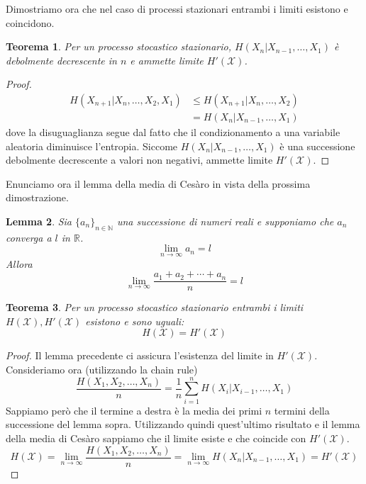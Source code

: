 \documentclass[a4paper,11pt]{book}
\theoremstyle{plain}
\newtheorem{teo}{Teorema}[chapter]
\newtheorem{lemma}[teo]{Lemma}
\theoremstyle{definition}
\theoremstyle{remark}
\newcommand{\R}{\mathbb{R}}
\newcommand{\N}{\mathbb{N}}
\begin{document}
Dimostriamo ora che nel caso di processi stazionari entrambi i limiti esistono e coincidono.
\begin{teo}
	Per un processo stocastico stazionario, $H(X_n|X_{n-1},\ldots, X_1)$ è debolmente decrescente in $n$ e ammette limite $H'(\mathcal{X})$.
\end{teo}
\begin{proof}
	\begin{equation*}
	\begin{split}
		H(X_{n+1}|X_n,\ldots, X_2, X_1) & \leq H(X_{n+1}|X_n,\ldots, X_2)\\
		& = H(X_n|X_{n-1},\ldots, X_1)
	\end{split}
	\end{equation*}
	dove la disuguaglianza segue dal fatto che il condizionamento a una variabile aleatoria diminuisce l'entropia.\newline
	Siccome $H(X_n|X_{n-1},\ldots, X_1)$ è una successione debolmente decrescente a valori non negativi, ammette limite $H'(\mathcal{X})$.
\end{proof}
Enunciamo ora il lemma della media di Cesàro in vista della prossima dimostrazione.
\begin{lemma}
	Sia $\{a_n\}_{n\in\N}$ una successione di numeri reali e supponiamo che $a_n$ converga a $l$ in $\R$.
	\begin{equation*}
		\lim\limits_{n\to\infty}a_n = l
	\end{equation*}
	Allora
	\begin{equation*}
		\lim\limits_{n\to\infty}\frac{a_1+a_2+\cdots+a_n}{n}=l
	\end{equation*}
\end{lemma}
\begin{teo}
	Per un processo stocastico stazionario entrambi i limiti $H(\mathcal{X}),H'(\mathcal{X})$ esistono e sono uguali:
	\begin{equation*}
		H(\mathcal{X}) = H'(\mathcal{X})
	\end{equation*}
\end{teo}
\begin{proof}
	Il lemma precedente ci assicura l'esistenza del limite in $H'(\mathcal{X})$. Consideriamo ora (utilizzando la chain rule)
	\begin{equation*}
		\frac{H(X_1,X_2,\ldots, X_n)}{n} = \frac{1}{n}\sum_{i = 1}^{n}{H(X_i|X_{i-1},\ldots, X_1)}
	\end{equation*}
	Sappiamo però che il termine a destra è la media dei primi $n$ termini della successione del lemma sopra. Utilizzando quindi quest'ultimo risultato e il lemma della media di Cesàro sappiamo che il limite esiste e che coincide con $H'(\mathcal{X})$.
	\begin{equation*}
		H(\mathcal{X}) = \lim\limits_{n\to\infty}\frac{H(X_1, X_2, \ldots, X_n)}{n} = \lim \limits_{n\to\infty}H(X_n|X_{n-1},\ldots, X_1)=H'(\mathcal{X})
	\end{equation*}
\end{proof}
\end{document}
